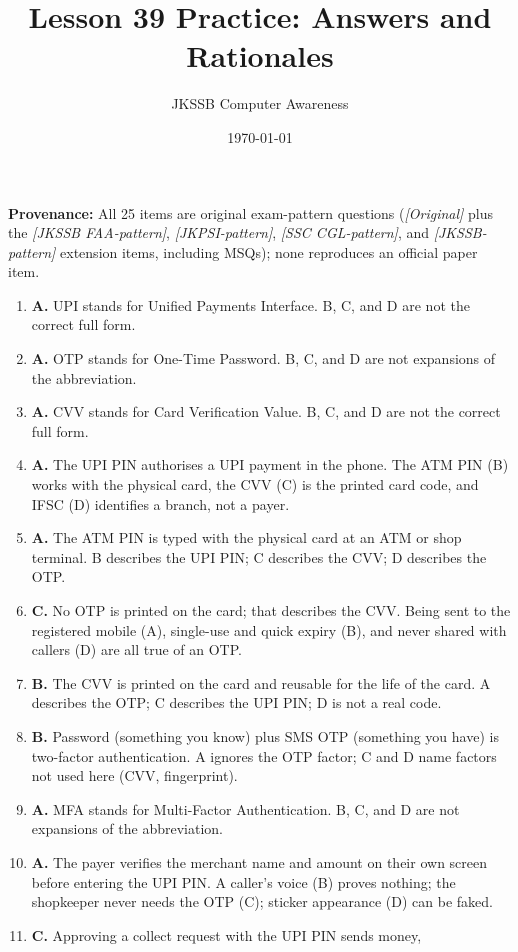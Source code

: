 \documentclass[11pt]{article}
\title{Lesson 39 Practice: Answers and Rationales}
\author{JKSSB Computer Awareness}
\date{\today}
\begin{document}
\maketitle
\noindent\textbf{Provenance:} All 25 items are original exam-pattern questions (\textit{[Original]} plus the \textit{[JKSSB FAA-pattern]}, \textit{[JKPSI-pattern]}, \textit{[SSC CGL-pattern]}, and \textit{[JKSSB-pattern]} extension items, including MSQs); none reproduces an official paper item.
\begin{enumerate}[label=\textbf{Q\arabic*.}, leftmargin=*]
\item \textbf{A.} UPI stands for Unified Payments Interface. B, C, and D
  are not the correct full form.
\item \textbf{A.} OTP stands for One-Time Password. B, C, and D are not
  expansions of the abbreviation.
\item \textbf{A.} CVV stands for Card Verification Value. B, C, and D are
  not the correct full form.
\item \textbf{A.} The UPI PIN authorises a UPI payment in the phone. The
  ATM PIN (B) works with the physical card, the CVV (C) is the printed card
  code, and IFSC (D) identifies a branch, not a payer.
\item \textbf{A.} The ATM PIN is typed with the physical card at an ATM or
  shop terminal. B describes the UPI PIN; C describes the CVV; D describes
  the OTP.
\item \textbf{C.} No OTP is printed on the card; that describes the CVV.
  Being sent to the registered mobile (A), single-use and quick expiry (B),
  and never shared with callers (D) are all true of an OTP.
\item \textbf{B.} The CVV is printed on the card and reusable for the life
  of the card. A describes the OTP; C describes the UPI PIN; D is not a
  real code.
\item \textbf{B.} Password (something you know) plus SMS OTP (something you
  have) is two-factor authentication. A ignores the OTP factor; C and D name
  factors not used here (CVV, fingerprint).
\item \textbf{A.} MFA stands for Multi-Factor Authentication. B, C, and D
  are not expansions of the abbreviation.
\item \textbf{A.} The payer verifies the merchant name and amount on their
  own screen before entering the UPI PIN. A caller's voice (B) proves
  nothing; the shopkeeper never needs the OTP (C); sticker appearance (D)
  can be faked.
\item \textbf{C.} Approving a collect request with the UPI PIN sends money,

\end{enumerate}
\end{document}
